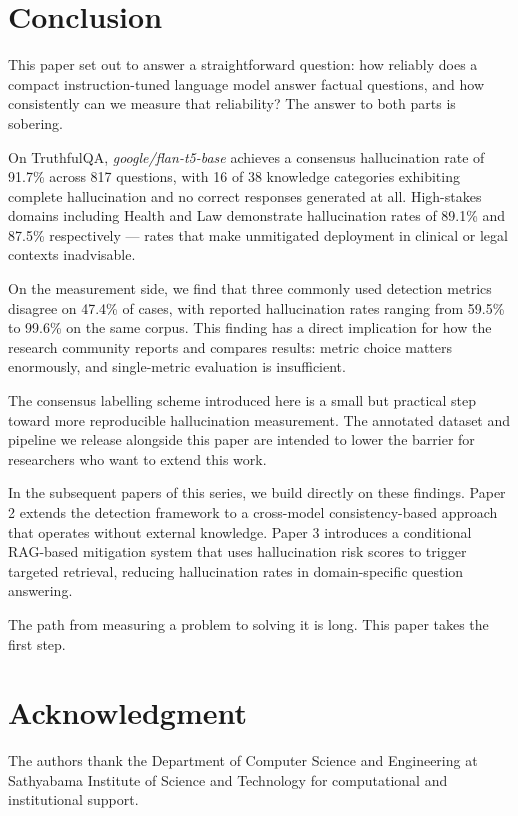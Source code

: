 \documentclass[conference]{IEEEtran}
\begin{document}
\section{Conclusion}
\label{sec:conclusion}

This paper set out to answer a straightforward question:
how reliably does a compact instruction-tuned language
model answer factual questions, and how consistently can
we measure that reliability?
The answer to both parts is sobering.

On TruthfulQA, \textit{google/flan-t5-base} achieves a
consensus hallucination rate of 91.7\% across 817
questions, with 16 of 38 knowledge categories exhibiting
complete hallucination and no correct responses generated
at all.
High-stakes domains including Health and Law demonstrate
hallucination rates of 89.1\% and 87.5\% respectively —
rates that make unmitigated deployment in clinical or
legal contexts inadvisable.

On the measurement side, we find that three commonly used
detection metrics disagree on 47.4\% of cases, with
reported hallucination rates ranging from 59.5\% to
99.6\% on the same corpus.
This finding has a direct implication for how the
research community reports and compares results:
metric choice matters enormously, and single-metric
evaluation is insufficient.

The consensus labelling scheme introduced here is a
small but practical step toward more reproducible
hallucination measurement.
The annotated dataset and pipeline we release alongside
this paper are intended to lower the barrier for
researchers who want to extend this work.

In the subsequent papers of this series, we build
directly on these findings.
Paper 2 extends the detection framework to a
cross-model consistency-based approach that operates
without external knowledge.
Paper 3 introduces a conditional RAG-based mitigation
system that uses hallucination risk scores to trigger
targeted retrieval, reducing hallucination rates in
domain-specific question answering.

The path from measuring a problem to solving it is long.
This paper takes the first step.

\section*{Acknowledgment}
The authors thank the Department of Computer Science and
Engineering at Sathyabama Institute of Science and Technology
for computational and institutional support.



\end{document}
